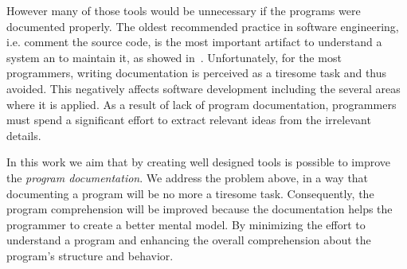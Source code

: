 However many of those tools would be unnecessary if the programs were documented properly. The oldest recommended practice in software engineering, i.e. comment the source code, is the most important artifact to understand a system an to maintain it, as showed in~\cite{de2005study}. Unfortunately, for the most programmers, writing documentation is perceived as a tiresome task and thus avoided. This negatively affects software development including the several areas where it is applied. As a result of lack of program documentation, programmers must spend a significant effort to extract relevant ideas from the irrelevant details.

In this work we aim that by creating well designed tools is possible to improve the \textit{program documentation}. We address the problem above, in a way that documenting a program will be no more a tiresome task. Consequently, the program comprehension will be improved because the documentation helps the programmer to create a better mental model. By minimizing the effort to understand a program and enhancing the overall comprehension about the program's structure and behavior.